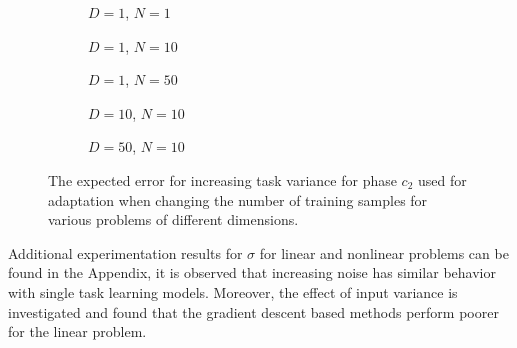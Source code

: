 \begin{figure}[!h]
  \centering
    \begin{subfigure}{0.33\textwidth}
      \centering
      \caption{$D=1$, $N=1$}
      \label{fig:nonlinear-c2-N-1-D-1}
    \end{subfigure}
    \begin{subfigure}{0.33\textwidth}
      \centering
      \caption{$D=1$, $N=10$}
      \label{fig:nonlinear-c2-N-10-D-1}
    \end{subfigure}
    \begin{subfigure}{0.33\textwidth}
      \centering
      \caption{$D=1$, $N=50$}
      \label{fig:nonlinear-c2-N-50-D-1}
    \end{subfigure}

    \begin{subfigure}{0.33\textwidth}
      \centering
      \caption{$D=10$, $N=10$}
      \label{fig:nonlinear-c2-N-10-D-10}
    \end{subfigure}
    \begin{subfigure}{0.33\textwidth}
      \centering
      \caption{$D=50$, $N=10$}
      \label{fig:nonlinear-c2-N-10-D-50}
    \end{subfigure}  


  \caption{The expected error for increasing task variance for phase $c_2$ used for adaptation when changing the number of training samples for various problems of different dimensions.}
  \label{fig:nonlinear-c2}
\end{figure}

Additional experimentation results for $\sigma$ for linear and nonlinear problems can be found in the Appendix, it is observed that increasing noise has similar behavior with single task learning models. Moreover, the effect of input variance is investigated and found that the gradient descent based methods perform poorer for the linear problem. 


